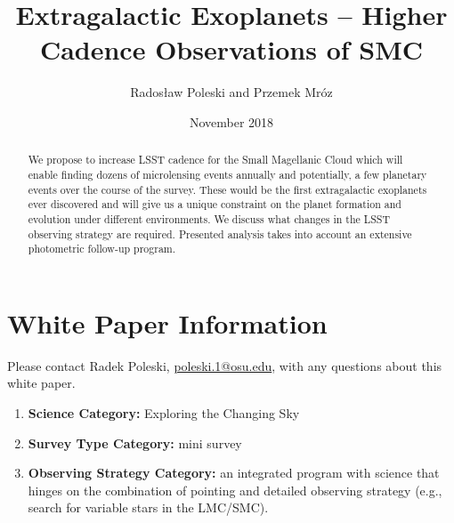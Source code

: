 \documentclass[12pt,letterpaper]{article}
\title{Extragalactic Exoplanets -- Higher Cadence Observations of SMC}
\author{Rados\l{}aw Poleski and Przemek Mr\'oz}
\date{November 2018}
\begin{document}
\maketitle

\begin{abstract}
We propose to increase LSST cadence for the Small Magellanic Cloud which will 
enable finding dozens of microlensing events annually and potentially, a few 
planetary events over the course of the survey.  These would be 
the first extragalactic exoplanets ever discovered and will give us a unique constraint on 
the planet formation and evolution under different environments.  We discuss what changes in 
the LSST observing strategy are required.  Presented analysis takes into account 
an extensive photometric follow-up program. 
\end{abstract}

\section{White Paper Information}
Please contact Radek Poleski, \url{poleski.1@osu.edu}, with any questions about this white paper.  %
\begin{enumerate} 
\item {\bf Science Category:} Exploring the Changing Sky
% 
\item {\bf Survey Type Category:} mini survey
\item {\bf Observing Strategy Category:} %
      an integrated program with science that hinges on the combination of pointing and detailed 
	observing strategy (e.g., search for variable stars in the 
	LMC/SMC). 
\end{enumerate}  
\end{document}

